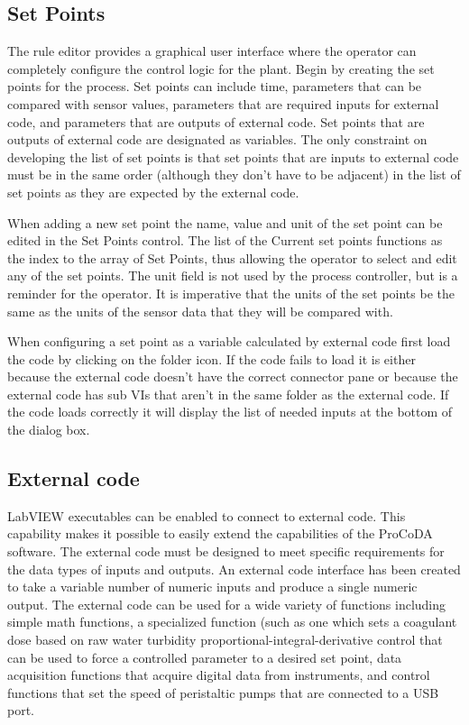 \documentclass[letterpaper,10pt,english]{sphinxmanual}
\begin{document}
\subsection{Set Points}
\label{\detokenize{ProCoDA/ProCoDA:set-points}}\label{\detokenize{ProCoDA/ProCoDA:heading-procoda-set-points}}
The rule editor provides a graphical user interface where the operator can completely configure the control logic for the plant. Begin by creating the set points for the process. Set points can include time, parameters that can be compared with sensor values, parameters that are required inputs for external code, and parameters that are outputs of external code. Set points that are outputs of external code are designated as variables. The only constraint on developing the list of set points is that set points that are inputs to external code must be in the same order (although they don’t have to be adjacent) in the list of set points as they are expected by the external code.

When adding a new set point the name, value and unit of the set point can be edited in the Set Points control. The list of the Current set points functions as the index to the array of Set Points, thus allowing the operator to select and edit any of the set points. The unit field is not used by the process controller, but is a reminder for the operator. It is imperative that the units of the set points be the same as the units of the sensor data that they will be compared with.


When configuring a set point as a variable calculated by external code first load the code by clicking on the folder icon. If the code fails to load it is either because the external code doesn’t have the correct connector pane or because the external code has sub VIs that aren’t in the same folder as the external code. If the code loads correctly it will display the list of needed inputs at the bottom of the dialog box.


\subsection{External code}
\label{\detokenize{ProCoDA/ProCoDA:external-code}}\label{\detokenize{ProCoDA/ProCoDA:heading-procoda-external-code}}
LabVIEW executables can be enabled to connect to external code. This capability makes it possible to easily extend the capabilities of the ProCoDA software. The external code must be designed to meet specific requirements for the data types of inputs and outputs. An external code interface has been created to take a variable number of numeric inputs and produce a single numeric output. The external code can be used for a wide variety of functions including simple math functions, a specialized function (such as one which sets a coagulant dose based on raw water turbidity proportional-integral-derivative control that can be used to force a controlled parameter to a desired set point, data acquisition functions that acquire digital data from instruments, and control functions that set the speed of peristaltic pumps that are connected to a USB port.
\end{document}

